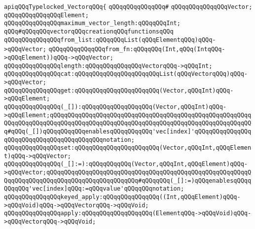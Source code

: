 \newline
\verb|apiqQQqTypelocked_VectorqQQq{|\newline
\verb|qQQqqQQqqQQqqQQq#|\newline
\verb|qQQqqQQqqQQqqQQqVector;|\newline
\verb|qQQqqQQqqQQqqQQqElement;|\newline
\newline
\verb|qQQqqQQqqQQqqQQqmaximum_vector_length:qQQqqQQqInt;|\newline
\newline
\verb|qQQq#qQQqqQQqvectorqQQqcreationqQQqfunctionsqQQq|\newline
\verb|qQQqqQQqqQQqqQQqfrom_list:qQQqqQQqList(qQQqElementqQQq)qQQq->qQQqVector;|\newline
\verb|qQQqqQQqqQQqqQQqfrom_fn:qQQqqQQq(Int,qQQq(IntqQQq->qQQqElement))qQQq->qQQqVector;|\newline
\newline
\verb|qQQqqQQqqQQqqQQqlength:qQQqqQQqqQQqqQQqVectorqQQq->qQQqInt;|\newline
\verb|qQQqqQQqqQQqqQQqcat:qQQqqQQqqQQqqQQqqQQqqQQqList(qQQqVectorqQQq)qQQq->qQQqVector;|\newline
\newline
\verb|qQQqqQQqqQQqqQQqget:qQQqqQQqqQQqqQQqqQQqqQQq(Vector,qQQqInt)qQQq->qQQqElement;|\newline
\verb|qQQqqQQqqQQqqQQq(_[]):qQQqqQQqqQQqqQQqqQQq(Vector,qQQqInt)qQQq->qQQqElement;qQQqqQQqqQQqqQQqqQQqqQQqqQQqqQQqqQQqqQQqqQQqqQQqqQQqqQQqqQQqqQQqqQQqqQQqqQQqqQQqqQQqqQQqqQQqqQQqqQQqqQQqqQQqqQQqqQQqqQQqqQQqqQQq#qQQq(_[])qQQqqQQqqQQqenablesqQQqqQQqqQQq'vec[index]'qQQqqQQqqQQqqQQqqQQqqQQqqQQqqQQqqQQqqQQqqQQqnotation;|\newline
\newline
\verb|qQQqqQQqqQQqqQQqset:qQQqqQQqqQQqqQQqqQQqqQQq(Vector,qQQqInt,qQQqElement)qQQq->qQQqVector;|\newline
\verb|qQQqqQQqqQQqqQQq(_[]:=):qQQqqQQqqQQq(Vector,qQQqInt,qQQqElement)qQQq->qQQqVector;qQQqqQQqqQQqqQQqqQQqqQQqqQQqqQQqqQQqqQQqqQQqqQQqqQQqqQQqqQQqqQQqqQQqqQQqqQQqqQQqqQQqqQQqqQQqqQQq#qQQqqQQq(_[]:=)qQQqenablesqQQqqQQqqQQq'vec[index]qQQq:=qQQqvalue'qQQqqQQqnotation;|\newline
\newline
\verb|qQQqqQQqqQQqqQQqkeyed_apply:qQQqqQQqqQQqqQQq((Int,qQQqElement)qQQq->qQQqVoid)qQQq->qQQqVectorqQQq->qQQqVoid;|\newline
\verb|qQQqqQQqqQQqqQQqapply:qQQqqQQqqQQqqQQqqQQq(ElementqQQq->qQQqVoid)qQQq->qQQqVectorqQQq->qQQqVoid;|\newline

